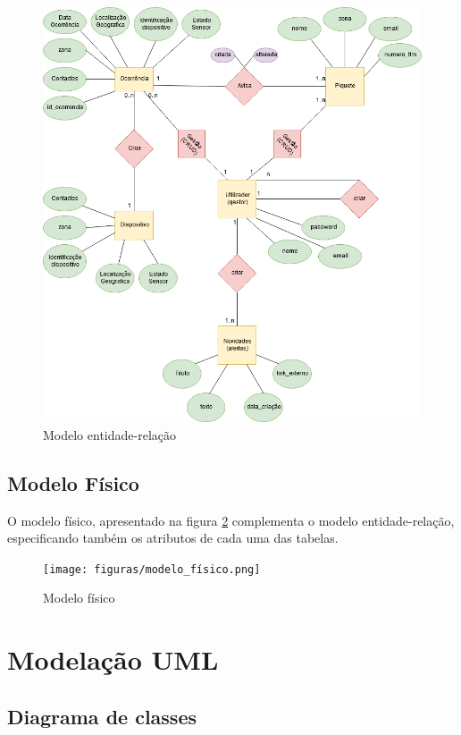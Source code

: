 \begin{figure}[!htb]
	\centering
	\includegraphics[width=\textwidth]{figuras/diagrama_e-r.png}
	\caption{Modelo entidade-relação}
	\label{fig:Modelo_E/R}
\end{figure}

\subsection{Modelo Físico}

O modelo físico, apresentado na figura \ref{fig:Modelo_fisico} complementa o modelo entidade-relação, especificando também os atributos de cada uma das tabelas.

\begin{figure}[!htb]
	\centering
	\texttt{[image: figuras/modelo\_físico.png]}
	\caption{Modelo físico}
	\label{fig:Modelo_fisico}
\end{figure}

\section{Modelação UML}



\subsection{Diagrama de classes}

